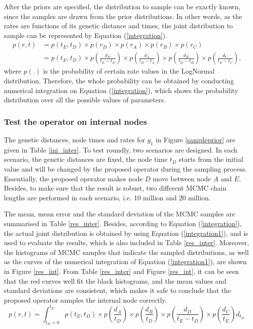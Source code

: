 \documentclass{bmcart}
\begin{document}
\begin{backmatter}
After the priors are specified, the distribution to sample can be exactly known, since the samples are drawn from the prior distributions. In other words, as the rates are functions of its genetic distance and times, the joint distribution to sample can be represented by Equation (\ref{integration}).
\begin{equation}\label{integration}
\begin{aligned}
p(r,t) &= p({t_E},{t_D}) \times p({r_D}) \times p({r_A}) \times p({r_B}) \times p({r_C}) \\&= p({t_E},{t_D}) \times p(\frac{{{d_D}}}{{t_E} - {t_D}}) \times p(\frac{{{d_A}}}{{t_D} - {t_A}}) \times p(\frac{{{d_B}}}{{t_D} - {t_B}}) \times p(\frac{{{d_C}}}{{t_E} - {t_C}})\text{,}
\end{aligned}
\end{equation}
where $p({.})$ is the probability of certain rate values in the LogNormal distribution. Therefore, the whole probability can be obtained by conducting numerical integration on Equation (\ref{integration}), which shows the probability distribution over all the possible values of parameters.

\subsubsection*{Test the operator on internal nodes}

The genetic distances, node times and rates for $g_1$ in Figure \ref{sampleprior} are given in Table \ref{ini_inter}. To test roundly, two scenarios are designed. In each scenario, the genetic distances are fixed, the node time $t_D$ starts from the initial value and will be changed by the proposed operator during the sampling process. Essentially, the proposed operator makes node $D$ move between node $A$ and $E$. Besides, to make sure that the result is robust, two different MCMC chain lengths are performed in each scenario, i.e. 10 million and 20 million.

The mean, mean error and the standard deviation of the MCMC samples are summarised in Table \ref{res_inter}. Besides, according to Equation (\ref{integration}), the actual joint distribution is obtained by using Equation (\ref{integration1}), and is used to evaluate the results, which is also included in Table \ref{res_inter}. Moreover, the histograms of MCMC samples that indicate the sampled distributions, as well as the curves of the numerical integration of Equation (\ref{integration1}), are shown in Figure \ref{res_int}. From Table \ref{res_inter} and Figure \ref{res_int}, it can be seen that the red curves well fit the black histograms, and the mean values and standard deviations are consistent, which makes it safe to conclude that the proposed operator samples the internal node correctly.
\begin{equation}
\label{integration1}
p(r,t) = \int_{{t_D} = 0}^{{t_E}} {p({t_E},{t_D}) \times p(\frac{{{d_A}}}{{{t_D}}}) \times p(\frac{{{d_B}}}{{{t_D}}}) \times p(\frac{{{d_D}}}{{{t_E} - {t_D}}}) \times p(\frac{{{d_C}}}{{{t_E}}}){d_{t_D}}}
\end{equation}


\end{backmatter}
\end{document}
